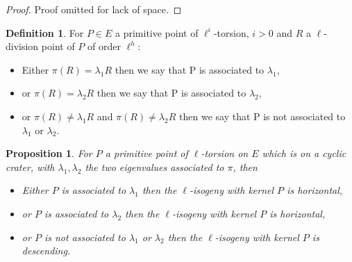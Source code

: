 \documentclass{article}
\theoremstyle{plain}
\newtheorem{prop}[thm]{Proposition}
\theoremstyle{definition}
\newtheorem{defi}[thm]{Definition}
\theoremstyle{remark}
\begin{document}
\begin{proof}
Proof omitted for lack of space.%
\end{proof}

\begin{defi}
For $P \in E$ a primitive point of $\ell^i$-torsion, $i>0$ and $R$ a $\ell$-division point of $P$ of order $\ell^h$:
\begin{itemize}
\item Either $\pi(R)=\lambda_1 R$ then we say that P is associated to $\lambda_1$, 
\item or $\pi(R)=\lambda_2 R$ then we say that P is associated to $\lambda_2$,
\item or $\pi(R)\neq \lambda_1 R$ and $\pi(R)\neq \lambda_2 R$ then we say that P is not associated to $\lambda_1$ or $\lambda_2$.
\end{itemize}  
\end{defi}

\begin{prop} \label{conjecture}
For $P$ a primitive point of $\ell$-torsion on $E$ which is on a cyclic crater, with $\lambda_1, \lambda_2$ the two eigenvalues associated to $\pi$, then
\begin{itemize}
\item Either $P$ is associated to $\lambda_1$ then the $\ell$-isogeny with kernel $P$ is horizontal,
\item or $P$ is associated to $\lambda_2$ then the $\ell$-isogeny with kernel $P$ is horizontal,
\item or $P$ is not associated to $\lambda_1$ or $\lambda_2$ then the $\ell$-isogeny with kernel $P$ is descending.
\end{itemize} 
\end{prop}
\end{document}
